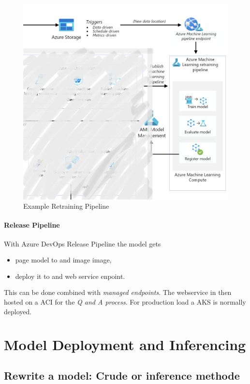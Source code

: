 \begin{figure}[H]
	\centering
	\includegraphics[scale = 0.2]{attachment/chapter_10/Scc023}
	\caption{Example Retraining Pipeline}
\end{figure}

\paragraph{Release Pipeline}
With Azure DevOps Release Pipeline the model gets
\begin{itemize}
	\item page model to and image image,
	\item deploy it to and web service enpoint. 
\end{itemize}
This can be done combined with \textit{managed endpoints}. The webservice in then hosted on a \gls{ACI} for the \textit{Q and A process}. For production load a \gls{AKS} is normally deployed.

\section{Model Deployment and Inferencing}

\subsection{Rewrite a model: Crude or inference methode}

